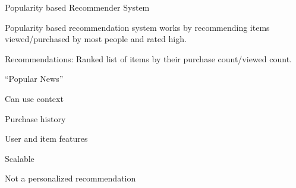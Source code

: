 Popularity based Recommender System
	\begin{bulletedlist}
		\item Popularity based recommendation system works by recommending items viewed/pur\-chased by most people and rated high.
		\item Recommendations: Ranked list of items by their purchase count/viewed count.
		\item``Popular News''
		\begin{bulletedlist}
			\item Can use context
			\item Purchase history
			\item User and item features
			\item Scalable
		\end{bulletedlist}
		\item Not a personalized recommendation
	\end{bulletedlist}

